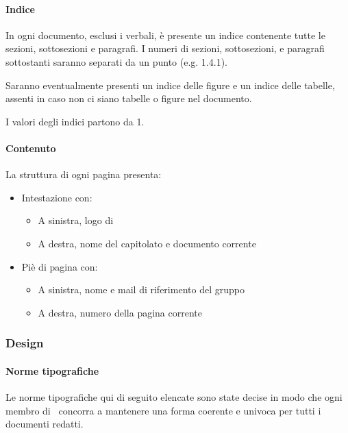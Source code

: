 			\paragraph{Indice}\label{PS:Documentazione:Struttura:Indice}
			In ogni documento, esclusi i verbali, è presente un indice contenente tutte le sezioni, sottosezioni e paragrafi. I numeri di sezioni, sottosezioni,
			e paragrafi sottostanti saranno separati da un punto (e.g. 1.4.1).\par
			Saranno eventualmente presenti un indice delle
			figure e un indice delle tabelle, assenti in caso non ci siano tabelle o figure nel documento.\par
			I valori degli indici partono da 1.

			\paragraph{Contenuto}\label{PS:Documentazione:Struttura:Contenuto}
			La struttura di ogni pagina presenta:
			\begin{itemize}
				\item Intestazione con:
				\begin{itemize}
					\item A sinistra, logo di \emph{\gruppo}
					\item A destra, nome del capitolato e documento corrente
				\end{itemize}
				\item Piè di pagina con:
				\begin{itemize}
					\item A sinistra, nome e mail di riferimento del gruppo
					\item A destra, numero della pagina corrente
				\end{itemize}
			\end{itemize}


		\subsubsection{Design}\label{PS:Documentazione:Design}

			\paragraph{Norme tipografiche}\label{PS:Documentazione:Design:NormeT}
			Le norme tipografiche qui di seguito elencate sono state decise in modo che ogni membro di \gruppo\ concorra a mantenere una forma coerente e univoca
			per tutti i documenti redatti.

